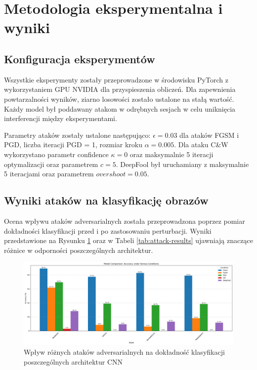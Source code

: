 \documentclass[12pt]{article}
\begin{document}
\section{Metodologia eksperymentalna i wyniki}

\subsection{Konfiguracja eksperymentów}

Wszystkie eksperymenty zostały przeprowadzone w środowisku PyTorch z wykorzystaniem GPU NVIDIA dla przyspieszenia obliczeń. Dla zapewnienia powtarzalności wyników, ziarno losowości zostało ustalone na stałą wartość. Każdy model był poddawany atakom w odrębnych sesjach w celu uniknięcia interferencji między eksperymentami.

Parametry ataków zostały ustalone następująco: $\epsilon = 0.03$ dla ataków FGSM i PGD, liczba iteracji PGD = 1, rozmiar kroku $\alpha = 0.005$. Dla ataku C\&W wykorzystano parametr confidence $\kappa = 0$ oraz maksymalnie 5 iteracji optymalizacji oraz parametrem $c=5$. DeepFool był uruchamiany z maksymalnie 5 iteracjami oraz parametrem $overshoot=0.05$.

\subsection{Wyniki ataków na klasyfikację obrazów}

Ocena wpływu ataków adversarialnych została przeprowadzona poprzez pomiar dokładności klasyfikacji przed i po zastosowaniu perturbacji. Wyniki przedstawione na Rysunku \ref{fig:model-comparison} oraz w Tabeli \ref{tab:attack-results} ujawniają znaczące różnice w odporności poszczególnych architektur.
\begin{figure}[H]
    \centering
    \includegraphics[width=1\textwidth]{model_comparison.png}
    \caption{Wpływ różnych ataków adversarialnych na dokładność klasyfikacji poszczególnych architektur CNN}
    \label{fig:model-comparison}
\end{figure}
\end{document}
